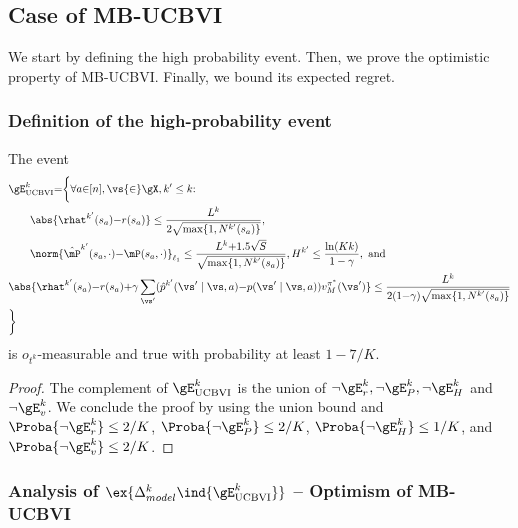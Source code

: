 \begin{subappendices}
\subsection{Case of MB-UCBVI}
\label{ssec:proof_UCBVI}

We start by defining the high probability event. Then, we prove the optimistic property of MB-UCBVI. Finally, we bound its expected regret.

\subsubsection{Definition of the high-probability event}

\begin{lem}
    \label{lem:concentration_ucbvi}
    The event
    \begin{align*}
        &\gE_\textnormal{UCBVI}^{k} {=}\bigg\{ \forall a{\in}[n], \vs{\in}\gX, k'\le k{:} \\
        &\qquad \abs{\rhat^{k'}(s_a){-}r(s_a)} \le\frac{L^{k}}{2\sqrt{\max\{1,N^{k'}(s_a)\} }}, \\
        &\qquad \norm{\hat{\mP}^{k'}(s_a,\cdot) {-}\mP(s_a,\cdot)}_{\ell_1} \le\frac{L^{k}{+}1.5\sqrt{S}}{\sqrt{\max\{1,N^{k'}(s_a)\} }}, H^{k'}\le \frac{\ln(Kk)}{1-\gamma}, \text{ and } \\
        &\abs{\rhat^{k'}(s_a){-}r(s_a) {+}\gamma\sum_{\vs'}(\hat{p}^{k'}(\vs'\mid\vs,a){-}p(\vs'\mid\vs,a))v_M^{\pi^*}(\vs')} \le
    \frac{L^{k}}{2(1{-}\gamma)\sqrt{\max\{1,N^{k'}(s_a)\} }} \\
        &\bigg\}
    \end{align*}
    is $o_{t^k}$-measurable and true with probability at least $1-7/K$.
\end{lem}
\begin{proof}
    The complement of $\gE^{k}_\text{UCBVI}$ is the union of $\neg \gE^{k}_r, \neg \gE^{k}_P, \neg \gE^{k}_H$ and $\neg \gE^{k}_v$.
    We conclude the proof by using the union bound and $\Proba{\neg \gE^{k}_r} \le 2/K$, $\Proba{\neg \gE^{k}_P} \le 2/K$, $\Proba{\neg \gE^{k}_H} \le 1/K$, and $\Proba{\neg \gE^{k}_v} \le 2/K$.
\end{proof}

\subsubsection{Analysis of \texorpdfstring{$\ex{\Delta_{model}^k \ind{\gE^{k}_\text{UCBVI}}}$}{} -- Optimism of MB-UCBVI}


\end{subappendices}
